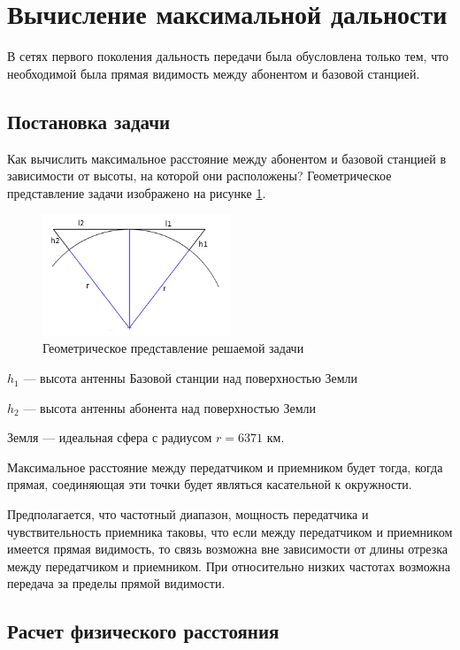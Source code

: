 \section{Вычисление максимальной дальности}
В сетях первого поколения дальность передачи была обусловлена только
тем, что необходимой была прямая видимость между абонентом
и базовой станцией.
\subsection{Постановка задачи}
Как вычислить максимальное расстояние между абонентом и базовой станцией в зависимости от высоты, на которой они расположены? Геометрическое представление задачи изображено на рисунке \ref{fig:img8}.

\begin{figure}[H]
	\centering
	\includegraphics[width=0.5\textwidth]{img/kich_bur/image8.png}
	\caption{Геометрическое представление решаемой задачи}
	\label{fig:img8}
\end{figure}

$ h_1 $ --- высота антенны Базовой станции над поверхностью Земли 

$ h_2 $ --- высота антенны абонента над поверхностью Земли 

Земля --- идеальная сфера с радиусом $r = 6371$ км.

Максимальное расстояние между передатчиком и приемником будет тогда, когда прямая, соединяющая эти точки будет являться касательной к окружности. 

Предполагается, что частотный диапазон, мощность передатчика и чувствительность
приемника таковы, что если между передатчиком и приемником имеется
прямая видимость, то связь возможна вне зависимости от длины отрезка
между передатчиком и приемником. При относительно низких частотах
возможна передача за пределы прямой видимости. 

\subsection{Расчет физического расстояния}

